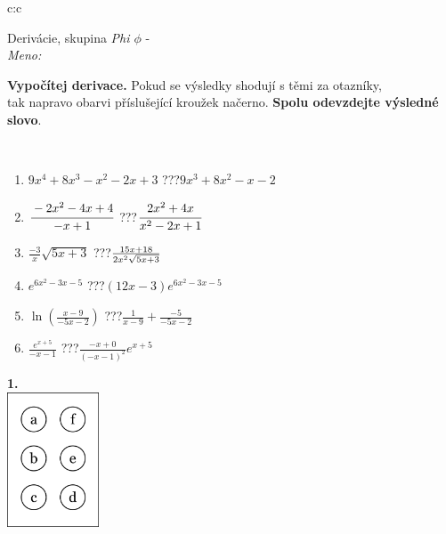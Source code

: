 \documentclass[10pt]{report}
\begin{document}
\begin{tabular}{c:c}
\begin{minipage}[c][104.5mm][t]{0.5\linewidth}
\begin{center}
\vspace{7mm}
{\huge Derivácie, skupina \textit{Phi $\phi$} -}\\[5mm]
\textit{Meno:}\phantom{xxxxxxxxxxxxxxxxxxxxxxxxxxxxxxxxxxxxxxxxxxxxxxxxxxxxxxxxxxxxxxxxx}\\[5mm]
\begin{minipage}{0.95\linewidth}
\begin{center}
\textbf{Vypočítej derivace.} Pokud se výsledky shodují s těmi za otazníky,\\tak napravo obarvi příslušející kroužek načerno. \textbf{Spolu odevzdejte výsledné slovo}.
\end{center}
\end{minipage}
\\[1mm]
\begin{minipage}{0.79\linewidth}
\begin{center}
\begin{varwidth}{\linewidth}
\begin{enumerate}
\normalsize
\item $9x^4+8x^3-x^2-2x+3$\quad \dotfill\; ???\;\dotfill \quad $9x^3+8x^2-x-2$
\item $\cfrac{-2x^2-4x+4}{-x+1}$\quad \dotfill\; ???\;\dotfill \quad $\cfrac{2x^2+4x}{x^2-2x+1}$
\item $\frac{-3}{x}\sqrt{5x+3}$\quad \dotfill\; ???\;\dotfill \quad $\frac{15x+18}{2x^2 \sqrt{\smash[b]{5x+3}}}$
\item $e^{6x^2-3x-5}$\quad \dotfill\; ???\;\dotfill \quad $(12x-3)e^{6x^2-3x-5}$
\item $\ln{\left(\frac{x-9}{-5x-2}\right)}$\quad \dotfill\; ???\;\dotfill \quad $\frac{1}{x-9}+\frac{-5}{-5x-2}$
\item $\frac{e^{x+5}}{-x-1}$\quad \dotfill\; ???\;\dotfill \quad $\frac{-x+0}{(-x-1)^2}e^{x+5}$
\end{enumerate}
\end{varwidth}
\end{center}
\end{minipage}
\begin{minipage}{0.20\linewidth}
\begin{center}
{\Huge\bfseries 1.} \\[2mm]
\includegraphics[height=40mm]{../images/braille.png}

\end{center}
\end{minipage}
\end{center}
\end{minipage}
\end{tabular}
\end{document}
